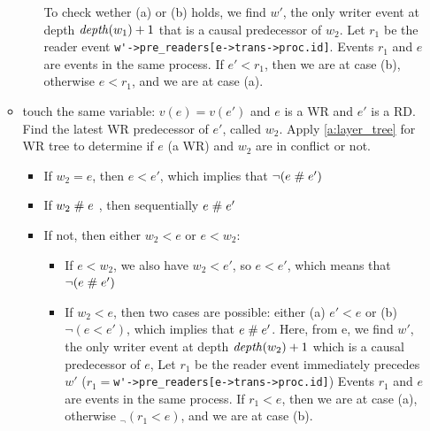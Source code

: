 \documentclass{llncs}
\begin{document}
\begin{enumerate}
\begin{itemize}
\begin{itemize}
					To check wether (a) or (b) holds, we find $w'$,
					the only writer event at depth $\mathop{\mathit{depth}} (w_1) + 1$ that is a causal predecessor of $w_2$.
					Let $r_1$ be the reader event 
					\verb!w'->pre_readers[e->trans->proc.id]!. Events $r_1$ and $e$ are events in the same process.
					If $ e' < r_1$, then we are at case (b), otherwise $e < r_1$, and we are at case (a).
			\end{itemize}
			\item 
				touch the same variable: $v(e) = v(e')$ and $e$ is a WR and $e'$ is a RD. 
				Find the latest WR predecessor of $e'$, called $w_2$.
				Apply \cref{a:layer_tree} for WR tree to determine if $e$ (a WR) and $w_2$ are in conflict or not.
				\begin{itemize}
					\item
						If $w_2 = e$, then $e < e'$, which implies that $\lnot (e \mathrel{\#} e')$
					\item
						If $w_2 \mathrel{\#} e$ , then sequentially $e \mathrel{\#} e'$
					\item
						If not, then either $ w_2< e$ or $e < w_2$:
						\begin{itemize}
							\item
								If $ e < w_2 $, we also have $w_2 < e'$, so $e < e'$, which means that $\lnot (e \mathrel{\#} e')$
							\item
								If $w_2 < e$, then two cases are possible: either (a) $e' < e$ or (b) $\lnot (e < e')$,
								which implies that $e \mathrel{\#} e'$. Here, from e, we find $w'$,
								the only writer event at depth $\mathop{\mathit{depth}} (w_2) + 1$ which is a causal predecessor of $e$,
								Let $r_1$ be the reader event immediately precedes $w'$ 
								($r_1 = $\verb!w'->pre_readers[e->trans->proc.id]!)
								Events $r_1$ and $e$ are events in the same process. 
								If $r_1 < e$, then we are at case (a), otherwise $_\lnot (r_1 < e) $, and we are at case (b). 
						\end{itemize}
				\end{itemize}
				

\end{itemize}
\end{enumerate}
\end{document}
